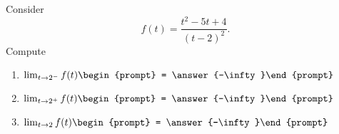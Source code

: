 \documentclass{ximera}
\author{Bart Snapp}
\begin{document}
\begin{exercise}
Consider 
\[
f(t) = \frac{t^2-5 t+4}{(t-2)^2}.
\]
Compute
\begin{enumerate}
\item $\lim_{t\to 2^- } f(t) \begin{prompt} = \answer{-\infty}\end{prompt}$
\item $\lim_{t\to 2^+ } f(t) \begin{prompt} = \answer{-\infty}\end{prompt}$
\item $\lim_{t\to 2 } f(t) \begin{prompt} = \answer{-\infty}\end{prompt}$
\end{enumerate}
\end{exercise}
\end{document}
